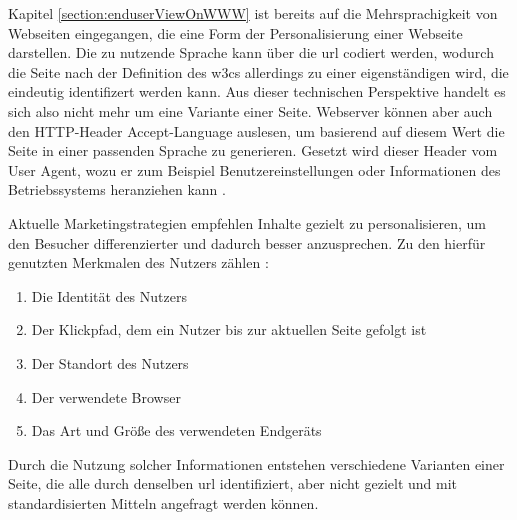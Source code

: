         Kapitel \ref{section:enduserViewOnWWW} ist bereits auf die Mehrsprachigkeit
        von Webseiten eingegangen, die eine Form der Personalisierung einer Webseite darstellen.
        Die zu nutzende Sprache kann über die \gls{url} codiert werden,
        wodurch die Seite nach der Definition des \glspl{w3c} allerdings zu einer eigenständigen {\resource} wird,
        die eindeutig identifizert werden kann.
        Aus dieser technischen Perspektive handelt es sich also nicht mehr um eine Variante einer Seite.
        Webserver können aber auch den HTTP-Header Accept-Language auslesen,
        um basierend auf diesem Wert die Seite in einer passenden Sprache zu generieren.
        Gesetzt wird dieser Header vom User Agent,
        wozu er zum Beispiel Benutzereinstellungen oder Informationen des Betriebssystems heranziehen kann
        \cite[Kapitel 5.3.5, Seite 42]{rfc:7231}.

        Aktuelle Marketingstrategien empfehlen Inhalte gezielt zu personalisieren,
        um den Besucher differenzierter und dadurch besser anzusprechen.
        Zu den hierfür genutzten Merkmalen des Nutzers zählen
        \cite{narongsak:contentPers}:
        
        \begin{enumerate}
            \item Die Identität des Nutzers
            \item Der Klickpfad, dem ein Nutzer bis zur aktuellen Seite gefolgt ist
            \item Der Standort des Nutzers
            \item Der verwendete Browser
            \item Das Art und Größe des verwendeten Endgeräts
        \end{enumerate}

        Durch die Nutzung solcher Informationen entstehen verschiedene Varianten einer Seite,
        die alle durch denselben \gls{url} identifiziert, aber nicht gezielt und mit standardisierten Mitteln
        angefragt werden können.